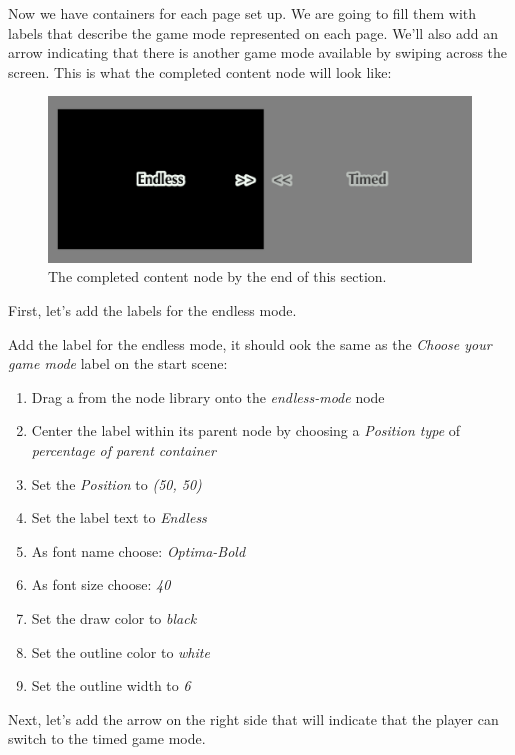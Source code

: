 Now we have containers for each page set up. We are going to fill them with
labels that describe the game mode represented on each page. We'll also add an
arrow indicating that there is another game mode available by swiping across the
screen. This is what the completed content node will look like:

\begin{figure}[H]
		\centering
		\includegraphics[width=0.6\linewidth]{images/Chapter7/content_node_completed.png}
		\caption{The completed content node by the end of this section.}
\end{figure}

First, let's add the labels for the endless mode.

\begin{leftbar}
Add the label for the endless mode, it should ook the same as the \textit{Choose your game mode} label on the start
scene:
\begin{enumerate}
  \item Drag a \cclabel{} from the node library onto the \textit{endless-mode}
  node
  \item Center the label within its parent node by choosing a \textit{Position type} of
\textit{percentage of parent container}
  \item Set the \textit{Position} to \textit{(50, 50)} 
  \item Set the label text to \textit{Endless}
  \item As font name choose: \textit{Optima-Bold}
  \item As font size choose: \textit{40}
  \item Set the draw color to \textit{black}
  \item Set the outline color to \textit{white}
  \item Set the outline width to \textit{6}
\end{enumerate}
\end{leftbar}

Next, let's add the arrow on the right side that will indicate that the player
can switch to the timed game mode.

